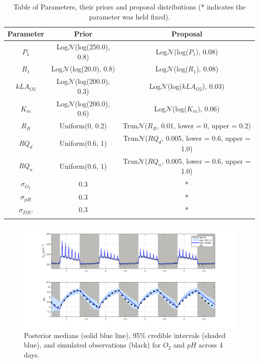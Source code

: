 \documentclass{ruthesis}
\begin{document}
\begin{longtable}{| c | c  |  c |}
	\hline
	\bfseries{Parameter} & \bfseries{Prior} &  \bfseries{Proposal} \\ \hline
	$P_1$  		& Log$\mathcal{N}$(log(250.0), 0.8)  & Log$\mathcal{N}$(log($P_1$), 0.08)   \\
	$R_1$  		& Log$\mathcal{N}$(log(20.0), 0.8)   & Log$\mathcal{N}$(log($R_1$), 0.08)   \\
	$kLA_{O2}$  & Log$\mathcal{N}$(log(200.0), 0.3)  & Log$\mathcal{N}$(log($kLA_{O2}$), 0.03) \\
	$K_m$ 		&  Log$\mathcal{N}$(log(200.0), 0.6) & Log$\mathcal{N}$(log($K_m$), 0.06) \\
	$R_R$  		& Uniform(0, 0.2) &  Trun$\mathcal{N}$($R_R$, 0.01, lower = 0, upper = 0.2) \\
	$RQ_d$  	& Uniform(0.6, 1) &  Trun$\mathcal{N}$($RQ_d$, 0.005, lower = 0.6, upper = 1.0)\\
	$RQ_n$  	& Uniform(0.6, 1) &  Trun$\mathcal{N}$($RQ_n$, 0.005, lower = 0.6, upper = 1.0)\\
	$\sigma_{O_2}$ 	& 0.3 	& * \\
	$\sigma_{pH}$ 	& 0.3 	& * \\
	$\sigma_{DIC}$ 	& 0.3 	& * \\	
	\hline
	\caption[.]{Table of Parameters, their priors and proposal distributions (* indicates the parameter was held fixed).}
	\label{tab:micro_sim_priors}
\end{longtable}
 

\begin{figure}
	\centerline{\includegraphics[width=1.2\textwidth]{images_microalgae/posterior_plots_with_fake_data/O2_pH}}
	\caption[.]{Posterior medians (solid blue line), 95\% credible intervals (shaded blue), and simulated observations (black) for $O_2$ and $pH$ across 4 days.}
	\label{fig:pos_sim_O2_pH}
\end{figure}
\end{document}
